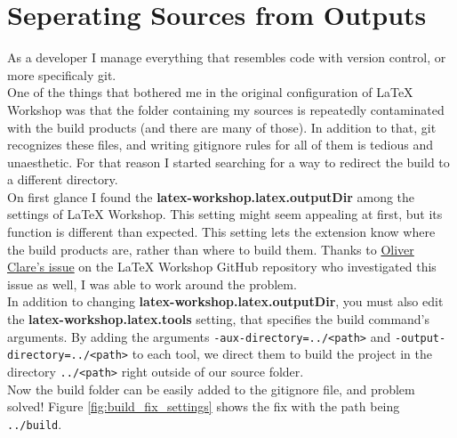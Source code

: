 \documentclass{article}
\newcommand{\latex}{\LaTeX\xspace}
\begin{document}
\section{Seperating Sources from Outputs} \label{sec:seperating_sources_from_outputs}
As a developer I manage everything that resembles code with version control, or more specificaly git.\\
One of the things that bothered me in the original configuration of \latex Workshop was that the folder containing my sources is repeatedly contaminated with the build products (and there are many of those). In addition to that, git recognizes these files, and writing gitignore rules for all of them is tedious and unaesthetic. For that reason I started searching for a way to redirect the build to a different directory.\\
On first glance I found the \textbf{latex-workshop.latex.outputDir} among the settings of \latex Workshop. This setting might seem appealing at first, but its function is different than expected. This setting lets the extension know where the build products are, rather than where to build them. Thanks to \href{https://github.com/James-Yu/LaTeX-Workshop/issues/548}{Oliver Clare's issue} on the \latex Workshop GitHub repository who investigated this issue as well, I was able to work around the problem.\\
In addition to changing \textbf{latex-workshop.latex.outputDir}, you must also edit the \textbf{latex-workshop.latex.tools} setting, that specifies the build command's arguments. By adding the arguments \texttt{-aux-directory=../<path>} and \texttt{-output-directory=../<path>} to each tool, we direct them to build the project in the directory \texttt{../<path>} right outside of our source folder.\\
Now the build folder can be easily added to the gitignore file, and problem solved! Figure \ref{fig:build_fix_settings} shows the fix with the path being \texttt{../build}.
\end{document}
